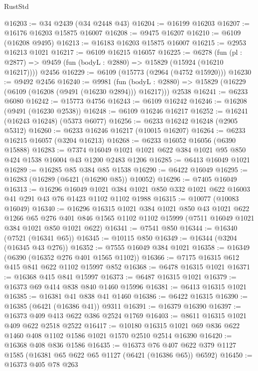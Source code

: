 \begin{lexlean}{RustStd}
\begin{coremodule}
@16203 := @34 @2439 (@34 @2448 @43)
@16204 := @16199 @16203
@16207 := @16176 @16203 @15875 @16007
@16208 := @9475 @16207
@16210 := @6109 (@16208 @9495)
@16213 := @16183 @16203 @15875 @16007
@16215 := @2953 @16213 @1021
@16217 := @6109 @16215 @16057
@16225 := @6278
    (fun (pl : @2877) => @9459 (fun (bodyL : @2880) => @15829 (@15924 (@16210 @16217))))
    @2456
@16229 := @6109 (@15773 (@2964 (@4752 @15920)))
@16230 := @9492 @2456
@16240 := @9981
    (fun (bodyL : @2880) => @15829 (@16229 (@6109 (@16208 (@9491 (@16230 @2894))) @16217)))
    @2538
@16241 := @6233 @6080
@16242 := @15773 @4756
@16243 := @6109 @16242
@16246 := @16208 (@9491 (@16230 @2538))
@16248 := @6109 @16246 @16217
@16252 := @16241 (@16243 @16248) (@5373 @6077)
@16256 := @6233 @16242 @16248 (@2905 @5312)
@16260 := @6233 @16246 @16217 (@10015 @16207)
@16264 := @6233 @16215 @16057 (@3204 @16213)
@16268 := @6233 @16052 @16056 (@6390 @15888)
@16283 := @7374 @16049 @1021 @1021 @622 @384 @1021 @95 @850 @424 @1538 @16004 @43 @1200 @2483 @1206
@16285 := @6413 @16049 @1021
@16289 := @16285 @85 @384 @85 @1538
@16290 := @6422 @16049
@16295 := @16283 (@16289 (@6421 (@16290 @85)) @10052)
@16296 := @7405 @16049
@16313 := @16296
    @16049
    @1021
    @384
    @1021
    @850
    @332
    @1021
    @622
    @16003
    @41
    @291
    @43
    @76
    @1423
    @1102
    @1102
    @1988
@16315 := @10077 (@10083 @16049)
@16340 := @16296
    @16315
    @1021
    @384
    @1021
    @850
    @43
    @1021
    @622
    @1266
    @65
    @276
    @401
    @846
    @1565
    @1102
    @1102
    @15999
    (@7511 @16049 @1021 @384 @1021 @850 @1021 @622)
@16341 := @7541 @850
@16344 := @16340 (@7521 (@16341 @65))
@16345 := @10115 @850
@16349 := @16344 (@3204 (@16345 @43 @276))
@16352 := @7555 @16049 @384 @1021
@16358 := @16349 (@6390 (@16352 @276 @401 @1565 @1102))
@16366 := @7175 @16315 @612 @415 @841 @622 @1102 @15997 @852
@16368 := @6478 @16315 @1021
@16371 := @16368 @415 @841 @15997
@16373 := @6487 @16315 @1021
@16379 := @16373 @69 @414 @838 @840 @1460 @15996
@16381 := @6413 @16315 @1021
@16385 := @16381 @41 @838 @41 @1460
@16386 := @6422 @16315
@16390 := @16385 (@6421 (@16386 @41)) @9311
@16391 := @16379 @16390
@16397 := @16373 @409 @413 @622 @386 @2524 @1769
@16403 := @8611 @16315 @1021 @409 @622 @2518 @2522
@16417 := @10180 @16315 @1021 @69 @836 @622 @1460 @408 @1102 @1586 @1021 @1570 @2510 @2514 @16390
@16420 := @16368 @408 @836 @1586
@16435 := @16373
    @76
    @407
    @622
    @379
    @1127
    @1585
    (@16381 @65 @622 @65 @1127 (@6421 (@16386 @65)) @6592)
@16450 := @16373
    @405
    @78
    @263

\end{coremodule}
\end{lexlean}
